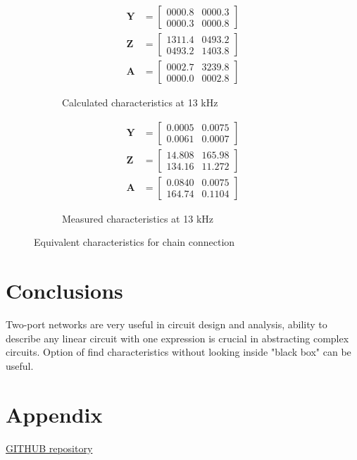 \documentclass[notitlepage, a4paper, 11pt]{article}
\begin{document}
	\begin{figure}[H]
		\begin{subfigure}{0.45\textwidth}
			\begin{align*}
				\mathbf{Y} &= 
				\begin{bmatrix}
					0000.8  &  0000.3 \\
					0000.3  &  0000.8
				\end{bmatrix}
				\\
				\mathbf{Z} &= 
				\begin{bmatrix}
				    1311.4 &   0493.2 \\
					0493.2 &   1403.8
				\end{bmatrix}
				\\
				\mathbf{A} &= 
				\begin{bmatrix}
					0002.7  &  3239.8 \\
					0000.0  &  0002.8
				\end{bmatrix}
			\end{align*}
			\caption{Calculated characteristics at 13 kHz}
		\end{subfigure}
		\hfill
		\begin{subfigure}{0.45\textwidth}
			\begin{align*}
				\mathbf{Y} &= 
				\begin{bmatrix}
					    0.0005   & 0.0075 \\
					0.0061   & 0.0007
				\end{bmatrix}
				\\
				\mathbf{Z} &= 
				\begin{bmatrix}
					   14.808 & 165.98\\
					134.16  & 11.272
				\end{bmatrix}
				\\
				\mathbf{A} &=
				\begin{bmatrix}
					    0.0840 &   0.0075\\
					164.74  &  0.1104
				\end{bmatrix} 
			\end{align*}
			\caption{Measured characteristics at 13 kHz}
		\end{subfigure}
		\caption{Equivalent characteristics for chain connection}
	\end{figure}
	
	\section{Conclusions}
	Two-port networks are very useful in circuit design and analysis, ability to describe any linear circuit with one expression is crucial in abstracting complex circuits. Option of find characteristics without looking inside "black box" can be useful.
	
	\newpage
	\appendix
	\section{Appendix}
	\href{https://github.com/kamilix2003/CT_labs}{GITHUB repository}
	\inputminted{matlab}{../Matlab/main.m}
	\inputminted{matlab}{../Matlab/import_csv.m}
	\inputminted{matlab}{../Matlab/Y_to_Z.m}
	\inputminted{matlab}{../Matlab/chain_to_Z.m}
	\inputminted{matlab}{../Matlab/Z_to_admittance.m}
	\inputminted{matlab}{../Matlab/Z_to_chain.m}
	
\end{document}
